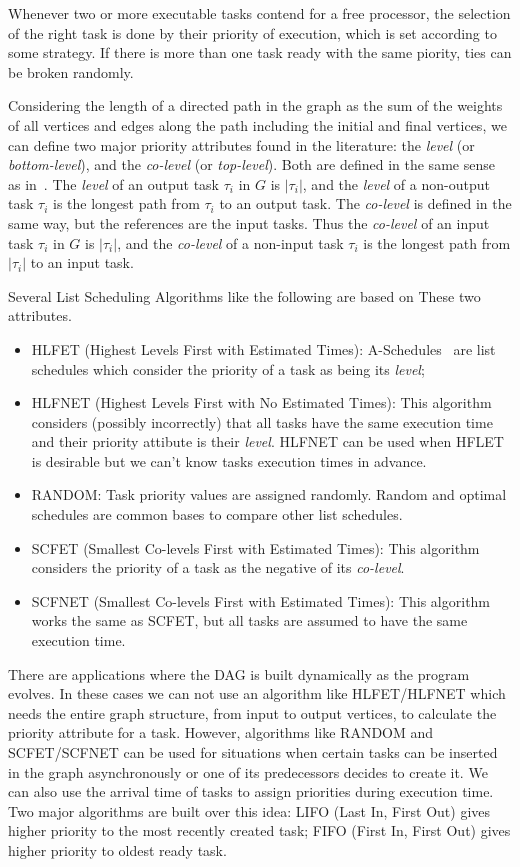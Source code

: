 \documentclass[twocolumn]{svjour3}
\begin{document}
Whenever two or more executable tasks contend for a free processor, the selection of the right task is done by their priority of execution, which is set according to some strategy. If there is more than one task ready with the same piority, ties can be broken randomly.

Considering the length of a directed path in the graph as the sum of the weights of all vertices and edges along the path including the initial and final vertices, we can define two major priority attributes found in the literature: the \emph{level} (or \emph{bottom-level}), and the \emph{co-level} (or \emph{top-level}). Both are defined in the same sense as in~\cite{coffman1973operating}. The \emph{level} of an output task $\tau_i$ in $G$ is $|\tau_i|$, and the \emph{level} of a non-output task $\tau_i$ is the longest path from $\tau_i$ to an output task. The \emph{co-level} is defined in the same way, but the references are the input tasks. Thus the \emph{co-level} of an input task $\tau_i$ in $G$ is $|\tau_i|$, and the \emph{co-level} of a non-input task $\tau_i$ is the longest path from $|\tau_i|$ to an input task.

Several List Scheduling Algorithms like the following are based on These two attributes.
\begin{itemize}
	\item HLFET (Highest Levels First with Estimated Times): A-Schedules~\cite{coffman1973operating} are list schedules which consider the priority of a task as being its \emph{level};
	\item HLFNET (Highest Levels First with No Estimated Times): This algorithm considers (possibly incorrectly) that all tasks have the same execution time and their priority attibute is their \emph{level}. HLFNET can be used when HFLET is desirable but we can't know tasks execution times in advance.
	\item RANDOM: Task priority values are assigned randomly. Random and optimal schedules are common bases to compare other list schedules.
	\item SCFET (Smallest Co-levels First with Estimated Times): This algorithm considers the priority of a task as the negative of its \emph{co-level}.
	\item SCFNET (Smallest Co-levels First with Estimated Times): This algorithm works the same as SCFET, but all tasks are assumed to have the same execution time.
\end{itemize}

There are applications where the DAG is built dynamically as the program evolves. In these cases we can not use an algorithm like HLFET/HLFNET which needs the entire graph structure, from input to output vertices, to calculate the priority attribute for a task. However, algorithms like RANDOM and SCFET/SCFNET can be used for situations when certain tasks can be inserted in the graph asynchronously or one of its predecessors decides to create it. We can also use the arrival time of tasks to assign priorities during execution time. Two major algorithms are built over this idea: LIFO (Last In, First Out) gives higher priority to the most recently created task; FIFO (First In, First Out) gives higher priority to oldest ready task.
\end{document}
